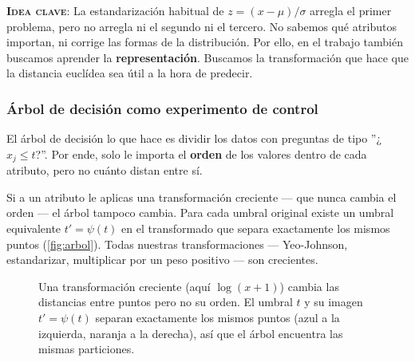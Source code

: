 \textbf{\textsc{Idea clave}}: La estandarización habitual de $z= (x-\mu)/\sigma$ arregla el primer problema, pero no arregla ni el segundo ni el tercero. No sabemos qué atributos importan, ni corrige las formas de la distribución. Por ello, en el trabajo también buscamos aprender la \textbf{representación}. Buscamos la transformación que hace que la distancia euclídea sea útil a la hora de predecir. 

\subsubsection{Árbol de decisión como experimento de control}
El árbol de decisión lo que hace es dividir los datos con preguntas de tipo ''¿$x_{j}\leq t$?''. Por ende, solo le importa el \textbf{orden} de los valores dentro de cada atributo, pero no cuánto distan entre sí. 

Si a un atributo le aplicas una transformación creciente --- que nunca cambia el orden --- el árbol tampoco cambia. Para cada umbral original existe un umbral equivalente $t'=\psi(t)$ en el transformado que separa exactamente los mismos puntos (\autoref{fig:arbol}). Todas nuestras transformaciones --- Yeo-Johnson, estandarizar, multiplicar por un peso positivo --- son crecientes.

\begin{figure}[htbp]
\centering
{}
\caption{Una transformación creciente (aquí $\log(x+1)$) cambia las distancias
entre puntos pero no su orden. El umbral $t$ y su imagen $t'=\psi(t)$ separan
exactamente los mismos puntos (azul a la izquierda, naranja a la derecha), así
que el árbol encuentra las mismas particiones.}
\label{fig:arbol}
\end{figure}

